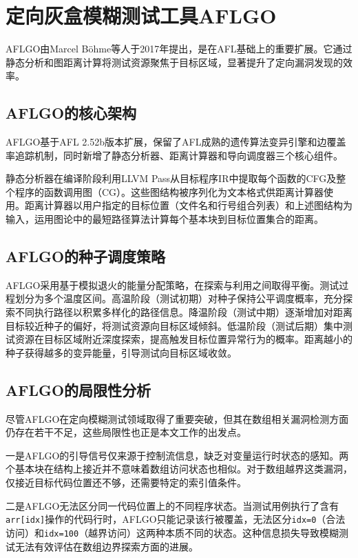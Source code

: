 \documentclass[bachelor]{njupthesis}
\begin{document}
\section{定向灰盒模糊测试工具AFLGO}

AFLGO由Marcel B\"ohme等人于2017年提出\cite{directedGreybox}，是在AFL基础上的重要扩展。它通过静态分析和图距离计算将测试资源聚焦于目标区域，显著提升了定向漏洞发现的效率。

\subsection{AFLGO的核心架构}

AFLGO基于AFL 2.52b版本扩展，保留了AFL成熟的遗传算法变异引擎和边覆盖率追踪机制，同时新增了静态分析器、距离计算器和导向调度器三个核心组件。

静态分析器在编译阶段利用LLVM Pass从目标程序IR中提取每个函数的CFG及整个程序的函数调用图（CG）。这些图结构被序列化为文本格式供距离计算器使用。距离计算器以用户指定的目标位置（文件名和行号组合列表）和上述图结构为输入，运用图论中的最短路径算法计算每个基本块到目标位置集合的距离。

\subsection{AFLGO的种子调度策略}

AFLGO采用基于模拟退火的能量分配策略，在探索与利用之间取得平衡。测试过程划分为多个温度区间。高温阶段（测试初期）对种子保持公平调度概率，充分探索不同执行路径以积累多样化的路径信息。降温阶段（测试中期）逐渐增加对距离目标较近种子的偏好，将测试资源向目标区域倾斜。低温阶段（测试后期）集中测试资源在目标区域附近深度探索，提高触发目标位置异常行为的概率。距离越小的种子获得越多的变异能量，引导测试向目标区域收敛。

\subsection{AFLGO的局限性分析}

尽管AFLGO在定向模糊测试领域取得了重要突破，但其在数组相关漏洞检测方面仍存在若干不足，这些局限性也正是本文工作的出发点。

一是AFLGO的引导信号仅来源于控制流信息，缺乏对变量运行时状态的感知。两个基本块在结构上接近并不意味着数组访问状态也相似。对于数组越界这类漏洞，仅接近目标代码位置还不够，还需要特定的索引值条件。

二是AFLGO无法区分同一代码位置上的不同程序状态。当测试用例执行了含有\texttt{arr[idx]}操作的代码行时，AFLGO只能记录该行被覆盖，无法区分\texttt{idx=0}（合法访问）和\texttt{idx=100}（越界访问）这两种本质不同的状态。这种信息损失导致模糊测试无法有效评估在数组边界探索方面的进展。
\end{document}

